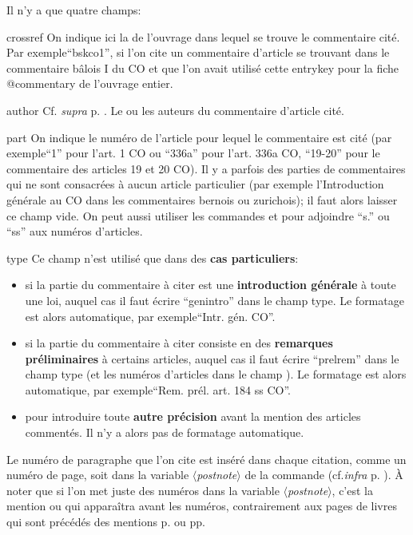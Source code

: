\documentclass[a4paper]{ltxdockit}[2011/03/25]
\newcommand{\supra}{\emph{supra}\xspace}
\newcommand{\infra}{\emph{infra}\xspace}
\newcommand{\Cf}{\textnormal{Cf. }}
\newcommand{\cf}{cf.\xspace}
\newcommand{\GM}{\enquote}
\newcommand{\pex}{\textnormal{par exemple}\xspace}
\newcommand{\Pex}{\textnormal{Par exemple}\xspace}
\newcommand{\variable}[1]{$\langle$\textsl{#1}$\rangle$}
\begin{document}
Il n'y a que quatre champs:
\begin{marglist}
\item[crossref] On indique ici la  de l'ouvrage dans lequel se trouve le commentaire cité. \Pex \GM{bskco1}, si l'on cite un commentaire d'article se trouvant dans le commentaire bâlois I du CO et que l'on avait utilisé cette entrykey pour la fiche @commentary de l'ouvrage entier.
\item[author] \Cf \supra p. \pageref{author}. Le ou les auteurs du commentaire d'article cité.
\item[part] On indique le numéro de l'article pour lequel le commentaire est cité (\pex \GM{1} pour l'art. 1 CO ou \GM{336a} pour l'art. 336a CO, \GM{19-20} pour le commentaire des articles 19 et 20 CO). Il y a parfois des parties de commentaires qui ne sont consacrées à aucun article particulier (\pex l'Introduction générale au CO dans les commentaires bernois ou zurichois); il faut alors laisser ce champ vide. On peut aussi utiliser les commandes  et  pour adjoindre \GM{s.} ou \GM{ss} aux numéros d'articles.
\item[type] Ce champ n'est utilisé que dans des \textbf{cas particuliers}:
	\begin{itemize}
	\item si la partie du commentaire à citer est une \textbf{introduction générale} à toute une loi, auquel cas il faut écrire \GM{genintro} dans le champ type. Le formatage est alors automatique, \pex \GM{Intr. gén. CO}.
	\item si la partie du commentaire à citer consiste en des \textbf{remarques préliminaires} à certains articles, auquel cas il faut écrire \GM{prelrem} dans le champ type (et les numéros d'articles dans le champ ). Le formatage est alors automatique, \pex \GM{Rem. prél. art. 184 ss CO}.
	\item pour introduire toute \textbf{autre précision} avant la mention des articles commentés. Il n'y a alors pas de formatage automatique.
	\end{itemize}
\end{marglist}

\label{citationcommentaire}Le numéro de paragraphe que l'on cite est inséré dans chaque citation, comme un numéro de page, soit dans la variable \variable{postnote} de la commande  (\cf \infra p. \pageref{citation}). À noter que si l'on met juste des numéros dans la variable \variable{postnote}, c'est la mention \parN ou \parNN qui apparaîtra avant les numéros, contrairement aux pages de livres qui sont précédés des mentions p. ou pp.
\end{document}
